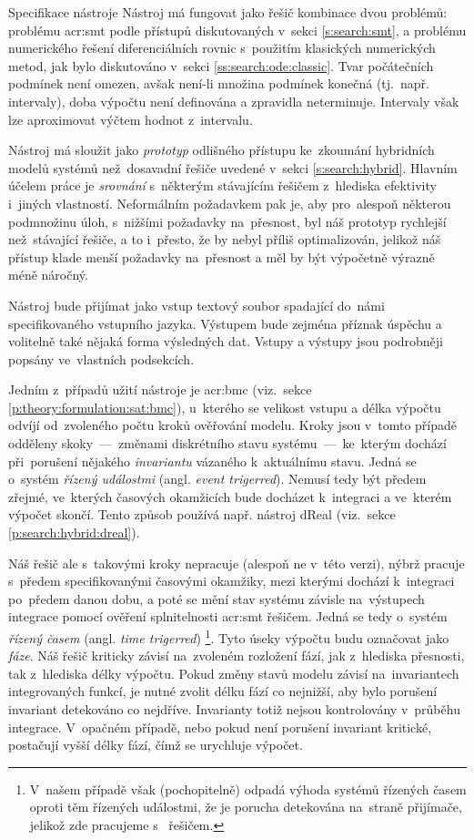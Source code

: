 \documentclass[thesis=M,czech]{FITthesis}[2012/06/26]
\newcommand{\acrlabel}[1]{acr:#1}
\newcommand{\acr}[1]{\acrshort{\acrlabel{#1}}}
\newcommand{\hl}[1]{\textit{#1}}
\newcommand{\name}[1]{\hl{#1}}
\newcommand{\rf}[1]{\ref{#1}}
\begin{document}
\begin{section}{Specifikace nástroje}\label{s:design:spec}
Nástroj má fungovat jako řešič kombinace
dvou problémů: problému \acr{smt}
podle přístupů diskutovaných v~sekci \rf{s:search:smt},
a problému numerického řešení diferenciálních rovnic
s~použitím klasických numerických metod,
jak bylo diskutováno v~sekci \rf{ss:search:ode:classic}.
Tvar počátečních podmínek není omezen,
avšak není-li množina podmínek konečná
(tj.~např. intervaly),
doba výpočtu není definována a zpravidla neterminuje.
Intervaly však lze aproximovat výčtem hodnot z~intervalu.

Nástroj má sloužit jako \hl{prototyp}
odlišného přístupu ke~zkoumání hybridních modelů systémů
než~dosavadní řešiče
uvedené v~sekci \rf{s:search:hybrid}.
Hlavním účelem práce je \hl{srovnání}
s~některým stávajícím řešičem
z~hlediska efektivity
i~jiných vlastností.
Neformálním požadavkem pak je,
aby pro~alespoň některou podmnožinu
úloh, s~nižšími požadavky na~přesnost, byl náš prototyp
rychlejší než~stávající řešiče,
a to i~přesto, že by nebyl příliš optimalizován,
jelikož náš přístup
klade menší požadavky na~přesnost
a měl by být výpočetně výrazně méně náročný.

Nástroj bude přijímat jako vstup textový soubor
spadající do~námi specifikovaného vstupního jazyka.
Výstupem bude zejména příznak úspěchu
a volitelně také nějaká forma výsledných dat.
Vstupy a výstupy jsou podrobněji popsány ve~vlastních podsekcích.

Jedním z~případů užití nástroje je \acr{bmc}
(viz.~sekce \rf{p:theory:formulation:sat:bmc}),
u~kterého se velikost vstupu a délka výpočtu
odvíjí od~zvoleného počtu kroků ověřování modelu.
Kroky jsou v~tomto případě odděleny
skoky~---~změnami diskrétního stavu
systému~---~ke~kterým dochází při~porušení
nějakého \name{invariantu} vázaného k~aktuálnímu stavu.
Jedná se o~systém \name{řízený událostmi}
(angl. \name{event trigerred}).
Nemusí tedy být předem zřejmé,
ve~kterých časových okamžicích bude docházet k~integraci
a ve~kterém výpočet skončí.
Tento způsob používá např. nástroj dReal
(viz.~sekce \rf{p:search:hybrid:dreal}).

Náš řešič ale s~takovými kroky nepracuje
(alespoň ne v~této verzi),
nýbrž pracuje s~předem specifikovanými časovými okamžiky,
mezi kterými dochází k~integraci po~předem danou dobu,
a poté se mění stav systému závisle na~výstupech integrace
pomocí ověření splnitelnosti \acr{smt} řešičem.
Jedná se tedy o~systém \name{řízený časem}
(angl. \name{time trigerred})%
\footnote{V~našem případě však (pochopitelně) odpadá
výhoda systémů řízených časem oproti těm řízených událostmi,
že je porucha detekována na~straně přijímače,
jelikož zde pracujeme s~ řešičem.}.
Tyto úseky výpočtu budu označovat jako \name{fáze}.
Náš řešič kriticky závisí na~zvoleném rozložení fází,
jak z~hlediska přesnosti, tak z~hlediska délky výpočtu.
Pokud změny stavů modelu závisí na~invariantech
integrovaných funkcí,
je nutné zvolit délku fází co nejnižší,
aby bylo porušení invariant detekováno co nejdříve.
Invarianty totiž nejsou kontrolovány v~průběhu integrace.
V~opačném případě, nebo pokud není porušení invariant kritické,
postačují vyšší délky fází,
čímž se urychluje výpočet.


\end{section}
\end{document}
